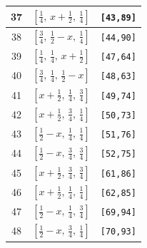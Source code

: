 \documentclass[fleqn,8pt]{jsarticle}
\begin{document}
\begin{longtable}{ccc}
37 & $\left[ \frac{1}{4},\, x + \frac{1}{2},\, \frac{1}{4} \right]$ & {\tt [43,89]} \\ \hline
38 & $\left[ \frac{3}{4},\, \frac{1}{2} - x,\, \frac{1}{4} \right]$ & {\tt [44,90]} \\ \hline
39 & $\left[ \frac{1}{4},\, \frac{1}{4},\, x + \frac{1}{2} \right]$ & {\tt [47,64]} \\ \hline
40 & $\left[ \frac{3}{4},\, \frac{1}{4},\, \frac{1}{2} - x \right]$ & {\tt [48,63]} \\ \hline
41 & $\left[ x + \frac{1}{2},\, \frac{1}{4},\, \frac{3}{4} \right]$ & {\tt [49,74]} \\ \hline
42 & $\left[ x + \frac{1}{2},\, \frac{3}{4},\, \frac{1}{4} \right]$ & {\tt [50,73]} \\ \hline
43 & $\left[ \frac{1}{2} - x,\, \frac{1}{4},\, \frac{1}{4} \right]$ & {\tt [51,76]} \\ \hline
44 & $\left[ \frac{1}{2} - x,\, \frac{3}{4},\, \frac{3}{4} \right]$ & {\tt [52,75]} \\ \hline
45 & $\left[ x + \frac{1}{2},\, \frac{3}{4},\, \frac{3}{4} \right]$ & {\tt [61,86]} \\ \hline
46 & $\left[ x + \frac{1}{2},\, \frac{1}{4},\, \frac{1}{4} \right]$ & {\tt [62,85]} \\ \hline
47 & $\left[ \frac{1}{2} - x,\, \frac{1}{4},\, \frac{3}{4} \right]$ & {\tt [69,94]} \\ \hline
48 & $\left[ \frac{1}{2} - x,\, \frac{3}{4},\, \frac{1}{4} \right]$ & {\tt [70,93]} \\
\end{longtable}
\renewcommand{\arraystretch}{1.2}
\end{document}
